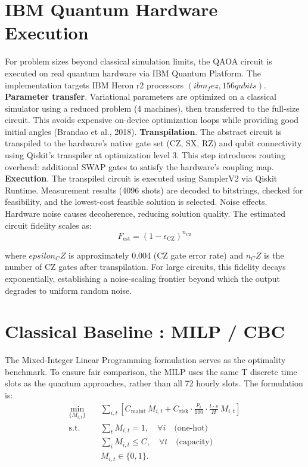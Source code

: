 \section{IBM Quantum Hardware Execution}
For problem sizes beyond classical simulation limits, the QAOA circuit is executed on real quantum hardware via IBM Quantum Platform. The implementation targets IBM Heron r2 processors $(ibm_fez, 156 qubits)$.
\textbf{Parameter transfer}. Variational parameters are optimized on a classical simulator using a reduced problem (4 machines), then transferred to the full-size circuit. This avoids expensive on-device optimization loops while providing good initial angles (Brandao et al., 2018). \textbf{Transpilation}. The abstract circuit is transpiled to the hardware's native gate set (CZ, SX, RZ) and qubit connectivity using Qiskit's transpiler at optimization level 3. This step introduces routing overhead: additional SWAP gates to satisfy the hardware's coupling map. \textbf{Execution}. The transpiled circuit is executed using SamplerV2 via Qiskit Runtime. Measurement results (4096 shots) are decoded to bitstrings, checked for feasibility, and the lowest-cost feasible solution is selected.
Noise effects. Hardware noise causes decoherence, reducing solution quality. The estimated circuit fidelity scales as:
\begin{equation}
F_{\text{est}} = (1 - \epsilon_{\text{CZ}})^{n_{\text{CZ}}}
\end{equation}

where $epsilon_CZ$ is approximately 0.004 (CZ gate error rate) and $n_CZ$ is the number of CZ gates after transpilation. For large circuits, this fidelity decays exponentially, establishing a noise-scaling frontier beyond which the output degrades to uniform random noise.

\section{Classical Baseline : MILP / CBC}
The Mixed-Integer Linear Programming formulation serves as the optimality benchmark. To ensure fair comparison, the MILP uses the same T discrete time slots as the quantum approaches, rather than all 72 hourly slots. The formulation is:
\begin{equation}
\begin{aligned}
\min_{\{M_{i,t}\}} \quad 
& \sum_{i,t} \left[
C_{\text{maint}} \, M_{i,t} 
+ C_{\text{risk}} \cdot \frac{p_i}{100} \cdot \frac{t \cdot s}{H} \, M_{i,t}
\right] \\
\text{s.t.} \quad
& \sum_{t} M_{i,t} = 1, \quad \forall i \quad \text{(one-hot)} \\
& \sum_{i} M_{i,t} \leq C, \quad \forall t \quad \text{(capacity)} \\
& M_{i,t} \in \{0,1\}.
\end{aligned}
\end{equation}

